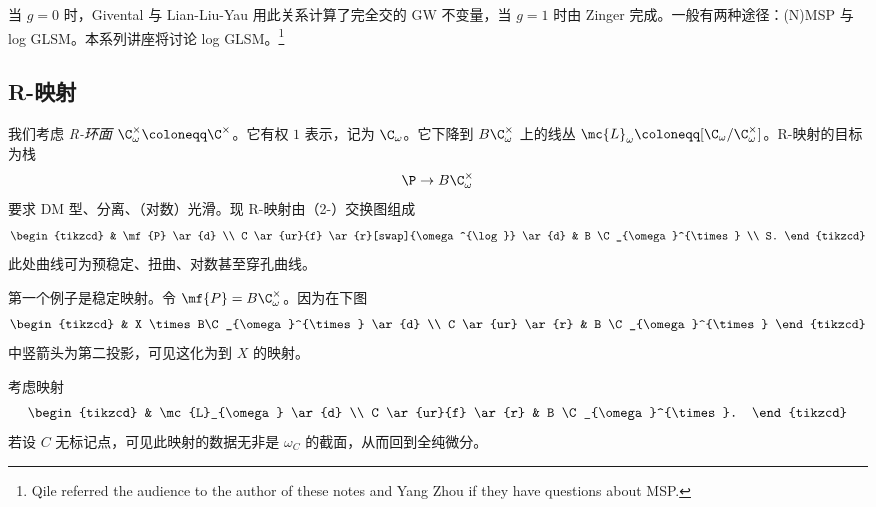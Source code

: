 当 \(g = 0\) 时，Givental 与 Lian-Liu-Yau 用此关系计算了完全交的 GW 不变量，当 \(g = 1\) 时由 Zinger 完成。一般有两种途径：(N)MSP 与 log GLSM。本系列讲座将讨论 log GLSM。\footnote{Qile referred the audience to the author of these notes and Yang Zhou if they have questions about MSP.}

\subsection{R-映射}%
\label{sub:R-maps}

我们考虑 \textit{R-环面} \(\C^{\times}_{\omega} \coloneqq \C^{\times}\)。它有权 \(1\) 表示，记为 \(\C_{\omega}\)。它下降到 \(B \C_{\omega}^{\times}\) 上的线丛 \(\mc{L}_{\omega} \coloneqq [\C_{\omega} / \C^{\times}_{\omega}]\)。R-映射的目标为栈
\[ \P \to B \C^{\times}_{\omega} \]
要求 DM 型、分离、（对数）光滑。现 R-映射由（2-）交换图组成
\begin{equation*}
\begin{tikzcd}
    & \mf{P} \ar{d} \\
    C \ar{ur}{f} \ar{r}[swap]{\omega^{\log}} \ar{d} & B \C_{\omega}^{\times} \\
    S.
\end{tikzcd}
\end{equation*}
此处曲线可为预稳定、扭曲、对数甚至穿孔曲线。

\begin{exm}
    第一个例子是稳定映射。令 \(\mf{P} = B\C_{\omega}^{\times}\)。因为在下图
    \begin{equation*}
    \begin{tikzcd}
        & X \times B\C_{\omega}^{\times} \ar{d} \\
        C \ar{ur} \ar{r} & B \C_{\omega}^{\times}
    \end{tikzcd}
    \end{equation*}
    中竖箭头为第二投影，可见这化为到 \(X\) 的映射。
\end{exm}

\begin{exm}
    考虑映射
    \begin{equation*}
    \begin{tikzcd}
        & \mc{L}_{\omega} \ar{d} \\
        C \ar{ur}{f} \ar{r} & B \C_{\omega}^{\times}.
    \end{tikzcd}
    \end{equation*}
    若设 \(C\) 无标记点，可见此映射的数据无非是 \(\omega_C\) 的截面，从而回到全纯微分。
\end{exm}

